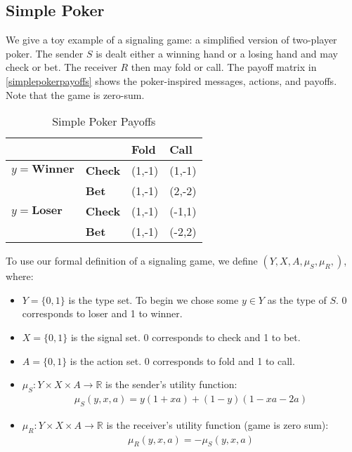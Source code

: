 \documentclass{article}
\begin{document}
\subsection{Simple Poker}
\label{ssec:SimplePoker}

We give a toy example of a signaling game: a simplified version of two-player poker. The sender $S$ is dealt either a winning hand or a losing hand and may check or bet. The receiver $R$ then may fold or call. The payoff matrix in \autoref{simplepokerpayoffs} shows the poker-inspired messages, actions, and payoffs. Note that the game is zero-sum.

\begin{table}[H]
	\centering
	\caption{Simple Poker Payoffs}
	\label{simplepokerpayoffs}
	\begin{tabular}{ll|l|l|}
		\cline{3-4}&       & \textbf{Fold} & \textbf{Call} \\ \hline
		\multicolumn{1}{|l|}{$y=\textbf{Winner}$} & \textbf{Check} & (1,-1)  & (1,-1)  \\ \cline{2-4}
		\multicolumn{1}{|l|}{}        & \textbf{Bet}   & (1,-1)  & (2,-2)  \\ \hline
		\multicolumn{1}{|l|}{$y=\textbf{Loser}$}  & \textbf{Check} & (1,-1)  & (-1,1)  \\ \cline{2-4}
		\multicolumn{1}{|l|}{}        & \textbf{Bet}   & (1,-1)  & (-2,2) \\ \hline
	\end{tabular}
\end{table}

To use our formal definition of a signaling game, we define $\left(Y, X, A, \mu_S, \mu_R, \right)$, where:
\begin{itemize}
    \item $Y = \lbrace 0, 1 \rbrace$ is the type set. To begin we chose some $y \in Y$ as the type of $S$. 0 corresponds to loser and 1 to winner.
    \item $X = \lbrace 0, 1 \rbrace$ is the signal set. 0 corresponds to check and 1 to bet.
    \item $A = \lbrace 0, 1 \rbrace$ is the action set. 0 corresponds to fold and 1 to call.
    \item $\mu_S: Y \times X \times A \longrightarrow \mathbb{R}$ is the sender's utility function:
        \begin{align*}
\mu_S(y, x, a) = y(1+xa) + (1-y)(1-xa-2a)
        \end{align*}
    \item $\mu_R: Y \times X \times A \longrightarrow \mathbb{R}$ is the receiver's utility function (game is zero sum):
        \begin{align*}
\mu_R(y, x, a) = -\mu_S(y, x, a)
        \end{align*}
\end{itemize}
\end{document}
